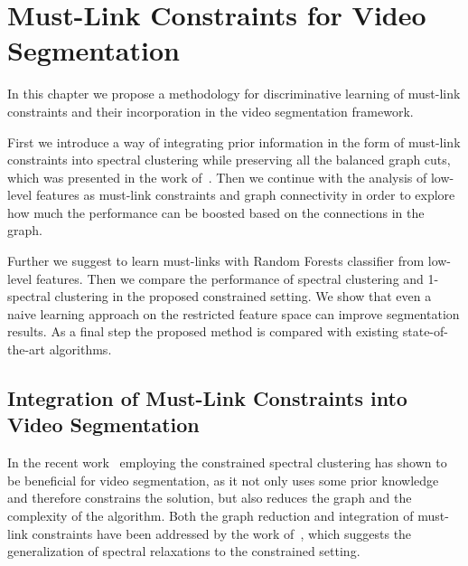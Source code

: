 \chapter{Must-Link Constraints for Video Segmentation}
\label{Chapter5}
In this chapter we propose a methodology for discriminative learning of must-link constraints and their incorporation in the video segmentation framework.

First we introduce a way of integrating prior information in the form of must-link constraints into spectral clustering while preserving all the
balanced graph cuts, which was presented in the work of~\cite{RangapuramH12}.
Then we continue with the analysis of low-level features as must-link constraints and graph connectivity in order to explore how much the performance can be boosted based on the connections in the graph.

Further we suggest to learn must-links with Random Forests classifier from low-level features.
Then we compare the performance of spectral clustering and 1-spectral clustering in the proposed constrained setting.  
We show that even a naive learning approach on the restricted feature space can improve segmentation results. 
As a final step the proposed method is compared with existing state-of-the-art algorithms.
\section{Integration of Must-Link Constraints into Video Segmentation}
\label{sec:ch5_cosc}
In the recent work~\cite{Galasso14} employing the constrained spectral clustering has shown to be beneficial for video segmentation, as it not only uses some prior knowledge and therefore constrains the solution, 
but also reduces the graph and the complexity of the algorithm. 
Both the graph reduction and integration of must-link constraints have been addressed by the work of~\cite{RangapuramH12}, which suggests the generalization of spectral relaxations 
to the constrained setting. 

